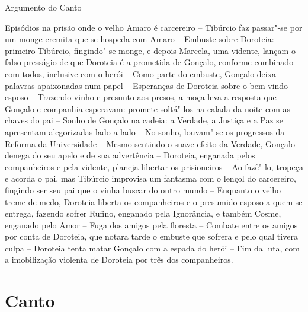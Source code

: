 \pagebreak
\thispagestyle{empty}

\movetoevenpage
\mbox{}\vfill
\thispagestyle{empty}
\noindent Argumento do Canto 
\medskip

{\footnotesize\noindent Episódios na prisão onde o velho Amaro é carcereiro -- Tibúrcio faz passar"-se por um
monge eremita que se hospeda com Amaro -- Embuste sobre Doroteia: primeiro
Tibúrcio, fingindo"-se monge, e depois Marcela, uma vidente, lançam o falso
presságio de que Doroteia é a prometida de Gonçalo, conforme combinado com todos,
inclusive com o herói -- Como parte do embuste, Gonçalo deixa palavras apaixonadas num papel 
-- Esperanças de Doroteia sobre o bem vindo esposo -- Trazendo vinho e presunto aos
presos, a moça leva a resposta que Gonçalo e companhia esperavam: promete soltá"-los
na calada da noite com as chaves do pai -- Sonho  de Gonçalo na cadeia: a Verdade,
a Justiça e a Paz se apresentam alegorizadas lado a lado -- No sonho, louvam"-se os
progressos da Reforma da Universidade -- Mesmo sentindo o suave efeito da Verdade, 
Gonçalo denega do seu apelo e de sua advertência -- Doroteia, enganada pelos companheiros
e pela vidente, planeja libertar os prisioneiros -- Ao fazê"-lo, tropeça e acorda o pai,
mas Tibúrcio improvisa um fantasma com o lençol do carcereiro, fingindo ser seu pai
que o vinha buscar do outro mundo -- Enquanto o velho treme de medo, Doroteia liberta os companheiros
e o presumido esposo a quem se entrega, fazendo sofrer Rufino, enganado pela Ignorância,
e também Cosme, enganado pelo Amor -- Fuga dos amigos pela floresta --  Combate entre os amigos por		\index{\Amor}
conta de Doroteia, que notara tarde o embuste que sofrera e pelo qual tivera culpa -- Doroteia
tenta matar Gonçalo com a espada do herói -- Fim da luta, com a imobilização violenta de Doroteia
por três dos companheiros.}


\chapter{Canto }

